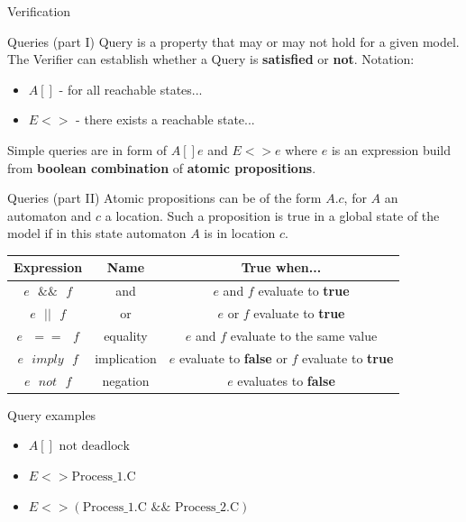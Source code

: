 \documentclass{beamer}
\begin{document}
\begin{frame}{Verification}

\end{frame}

\begin{frame}{Queries (part I)}
	Query is a property that may or may not hold for a given model. The Verifier can establish whether a Query is \textbf{satisfied} or \textbf{not}.\newline
	Notation:
	\begin{itemize}
		\item $A[]$ - for all reachable states...
		\item $E<>$ - there exists a reachable state...
	\end{itemize}
	Simple queries are in form of $A[] e$ and $E<> e$ where $e$ is an expression build from \textbf{boolean combination} of \textbf{atomic propositions}.
\end{frame}

\begin{frame}{Queries (part II)}
	Atomic propositions can be of the form $A.c$, for $A$ an automaton and $c$ a location. Such a proposition is true in a global state of the model if in this state automaton $A$ is in location $c$.\newline
	
	\begin{tabular}{|c|c|c|}
		\hline \textbf{Expression} & \textbf{Name} & \textbf{True when...} \\ 
		\hline $e\text{ }\&\&\text{ }f$ & and & $e$ and $f$ evaluate to \textbf{true}	 \\ 
		\hline $e\text{ }||\text{ }f$ & or & $e$ or $f$ evaluate to \textbf{true} \\ 
		\hline $e\text{ }==\text{ }f$ & equality & $e$ and $f$ evaluate to the same value \\ 
		\hline $e\text{ }imply\text{ }f$ & implication & $e$ evaluate to \textbf{false} or $f$ evaluate to \textbf{true}\\ 
		\hline $e\text{ }not\text{ }f$ & negation & $e$ evaluates to \textbf{false} \\ 
		\hline 
	\end{tabular} 

\end{frame}

\begin{frame}{Query examples}
	\begin{itemize}
		\item $A[] \text{ not deadlock}$
		\item $E<> \text{Process\_1.C}$
		\item $E<> (\text{Process\_1.C } \&\& \text{ Process\_2.C})$
		
	\end{itemize}
\end{frame}
\end{document}
